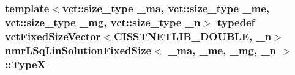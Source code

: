 \hypertarget{classnmr_l_sq_lin_solution_fixed_size_aa00d3b54073dac6aba6e3793d4f88348}{
\subsubsection[{Type\-X}]{\setlength{\rightskip}{0pt plus 5cm}template$<$vct\-::size\-\_\-type \-\_\-ma, vct\-::size\-\_\-type \-\_\-me, vct\-::size\-\_\-type \-\_\-mg, vct\-::size\-\_\-type \-\_\-n$>$ typedef {\bf vct\-Fixed\-Size\-Vector}$<$C\-I\-S\-S\-T\-N\-E\-T\-L\-I\-B\-\_\-\-D\-O\-U\-B\-L\-E, \-\_\-n$>$ {\bf nmr\-L\-Sq\-Lin\-Solution\-Fixed\-Size}$<$ \-\_\-ma, \-\_\-me, \-\_\-mg, \-\_\-n $>$\-::{\bf Type\-X}}}\label{classnmr_l_sq_lin_solution_fixed_size_aa00d3b54073dac6aba6e3793d4f88348}


